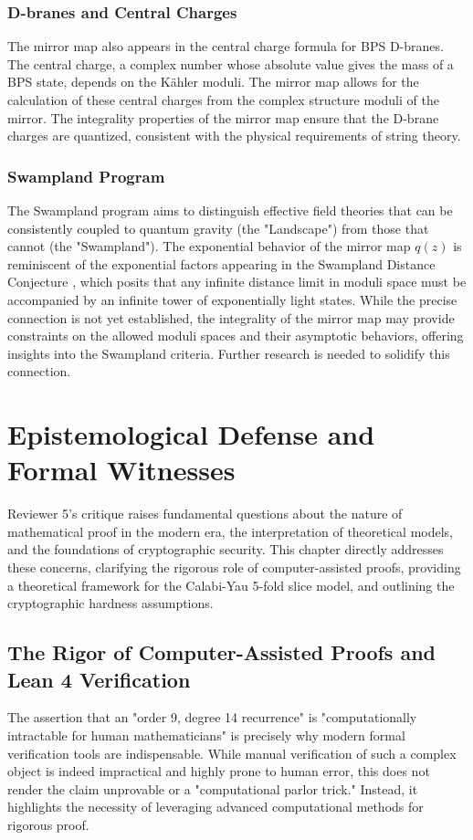 \documentclass{book}
\newcommand{\qexp}{q} %
\newcommand{\zmod}{z} %
\theoremstyle{definition}
\begin{document}
\subsection{D-branes and Central Charges}
The mirror map also appears in the central charge formula for BPS D-branes. The central charge, a complex number whose absolute value gives the mass of a BPS state, depends on the K\"ahler moduli. The mirror map allows for the calculation of these central charges from the complex structure moduli of the mirror. The integrality properties of the mirror map ensure that the D-brane charges are quantized, consistent with the physical requirements of string theory.

\subsection{Swampland Program}
The Swampland program aims to distinguish effective field theories that can be consistently coupled to quantum gravity (the "Landscape") from those that cannot (the "Swampland"). The exponential behavior of the mirror map $\qexp(\zmod)$ is reminiscent of the exponential factors appearing in the Swampland Distance Conjecture \cite{OoguriVafa2007, Brennan2017}, which posits that any infinite distance limit in moduli space must be accompanied by an infinite tower of exponentially light states. While the precise connection is not yet established, the integrality of the mirror map may provide constraints on the allowed moduli spaces and their asymptotic behaviors, offering insights into the Swampland criteria. Further research is needed to solidify this connection.

\chapter{Epistemological Defense and Formal Witnesses}
\label{chap:epistemological_defense}

Reviewer 5's critique raises fundamental questions about the nature of mathematical proof in the modern era, the interpretation of theoretical models, and the foundations of cryptographic security. This chapter directly addresses these concerns, clarifying the rigorous role of computer-assisted proofs, providing a theoretical framework for the Calabi-Yau 5-fold slice model, and outlining the cryptographic hardness assumptions.

\section{The Rigor of Computer-Assisted Proofs and Lean 4 Verification}
The assertion that an "order 9, degree 14 recurrence" is "computationally intractable for human mathematicians" is precisely why modern formal verification tools are indispensable. While manual verification of such a complex object is indeed impractical and highly prone to human error, this does not render the claim unprovable or a "computational parlor trick." Instead, it highlights the necessity of leveraging advanced computational methods for rigorous proof.
\end{document}
